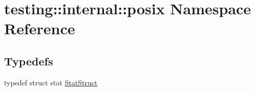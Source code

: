 \hypertarget{namespacetesting_1_1internal_1_1posix}{\section{testing\-:\-:internal\-:\-:posix Namespace Reference}
\label{namespacetesting_1_1internal_1_1posix}
}
\subsection*{Typedefs}
\begin{DoxyCompactItemize}
\item 
typedef struct stat \hyperlink{namespacetesting_1_1internal_1_1posix_a8eb9f08d3af29941c2d2a964cfff3ecb}{Stat\-Struct}
\end{DoxyCompactItemize}

